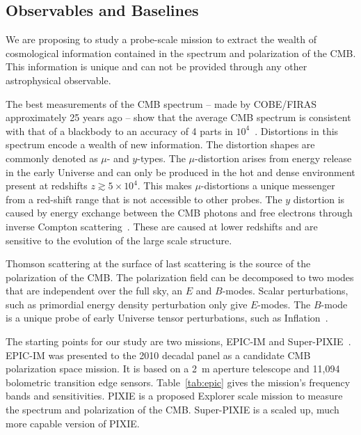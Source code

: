 
\subsection{Observables and Baselines}
\label{sec:observables}

\vspace{-0.05in}

We are proposing to study a probe-scale mission to extract the wealth 
of cosmological information contained in the spectrum and polarization of the \ac{CMB}. This information is unique
and can not be provided through any other astrophysical observable. 

The best measurements of the \ac{CMB} spectrum -- made by COBE/FIRAS approximately 25 years ago --
show that the average CMB spectrum is consistent with that of a blackbody to an accuracy of 4 parts 
in $10^{4}$~\cite{Mather1994, Fixsen1996}. Distortions in this spectrum encode a wealth of new information.
The distortion shapes are commonly denoted as $\mu$- and $y$-types. The 
$\mu$-distortion arises from energy release in the early Universe and can only be produced in the hot and dense 
environment present at redshifts $z\gtrsim 5\times10^4$. This makes $\mu$-distortions a unique messenger from a red-shift 
range that is not accessible to other probes. The $y$ distortion is caused by 
energy exchange between the \ac{CMB} photons and free electrons through inverse Compton 
scattering~\cite{Zeldovich1969, Sunyaev1970mu}. These are caused at lower redshifts and are sensitive to the 
evolution of the large scale structure. 

Thomson scattering at the surface of last scattering is the source of the polarization of the \ac{CMB}. The polarization field 
can be decomposed to two modes that are independent over the full sky, an $E$ and $B$-modes. Scalar perturbations, 
such as primordial energy density perturbation only give $E$-modes. The $B$-mode is a unique probe of early Universe 
tensor perturbations, such as Inflation~\cite{kamionkowski97a,zaldarriaga97}. 

The starting points for our study are two missions, EPIC-IM and Super-PIXIE~\cite{epic_im,pixie}. EPIC-IM was presented 
to the 2010 decadal panel as a candidate \ac{CMB} polarization space mission. It is based on a 2~m aperture telescope and 11,094 bolometric 
transition edge sensors. Table~\ref{tab:epic} gives the mission's frequency bands and sensitivities. PIXIE is a proposed Explorer 
scale mission to measure the spectrum and polarization of the CMB. Super-PIXIE is a scaled up, much more capable version 
of PIXIE.


